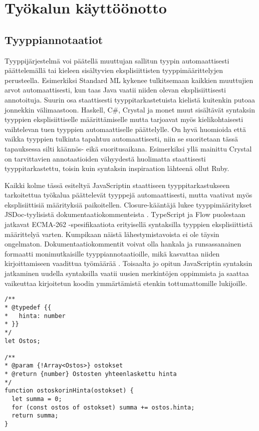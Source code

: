 \chapter{Työkalun käyttöönotto}

\section{Tyyppiannotaatiot}

Tyyppijärjestelmä voi päätellä muuttujan sallitun tyypin automaattisesti
päättelemällä tai kieleen sisältyvien eksplisiittisten tyyppimäärittelyjen
perusteella. Esimerkiksi Standard ML kykenee tulkitsemaan kaikkien muuttujien
arvot automaattisesti, kun taas Java vaatii niiden olevan eksplisiittisesti
annotoituja. Suurin osa staattisesti tyyppitarkastetuista kielistä kuitenkin
putoaa jonnekkin välimaastoon. Haskell, C\#, Crystal ja monet muut sisältävät
syntaksin tyyppien eksplisiittiselle määrittämiselle mutta tarjoavat myös
kielikohtaisesti vaihtelevan tuen tyyppien automaattiselle päättelylle.
On hyvä huomioida että vaikka tyyppien tulkinta tapahtuu automaattisesti,
niin se suoritetaan tässä tapauksessa silti käännös- eikä suoritusaikana.
Esimerkiksi yllä mainittu Crystal on tarvittavien annotaatioiden vähyydestä
huolimatta staattisesti tyyppitarkastettu, toisin kuin syntaksin inspiraation
lähteenä ollut Ruby.

Kaikki kolme tässä esiteltyä JavaScriptin staattiseen tyyppitarkastukseen
tarkoitettua työkalua päättelevät tyyppejä automaattisesti, mutta vaativat
myös eksplisiittisiä määrityksiä paikoitellen. Closure-kääntäjä lukee
tyyppimääritykset JSDoc-tyylisistä dokumentaatiokommenteista \cite{annotatingJSforClosure}.
TypeScript ja Flow puolestaan jatkavat ECMA-262 -spesifikaatiota erityisellä syntaksilla
tyyppien eksplisiittistä määrittelyä varten. Kumpikaan näistä
lähestymistavoista ei ole täysin ongelmaton. Dokumentaatiokommentit voivat
olla hankala ja runsassanainen formaatti monimutkaisille tyyppiannotaatioille,
mikä kasvattaa niiden kirjoittamiseen vaadittua työmäärää \cite{TypeScriptatBuild}.
Toisaalta jo opitun JavaScriptin syntaksin jatkaminen uudella syntaksilla
vaatii uusien merkintöjen oppimmista ja saattaa vaikeuttaa kirjoitetun koodin
ymmärtämistä etenkin tottumattomille lukijoille.

\begin{minipage}{\linewidth}
\begin{lstlisting}[caption=Esimerkki Closure-annotaatiosta funktiolle]
/**
* @typedef {{
*   hinta: number
* }}
*/
let Ostos;

/**
* @param {!Array<Ostos>} ostokset
* @return {number} Ostosten yhteenlaskettu hinta
*/
function ostoskorinHinta(ostokset) {
  let summa = 0;
  for (const ostos of ostokset) summa += ostos.hinta;
  return summa;
}
\end{lstlisting}
\end{minipage}

